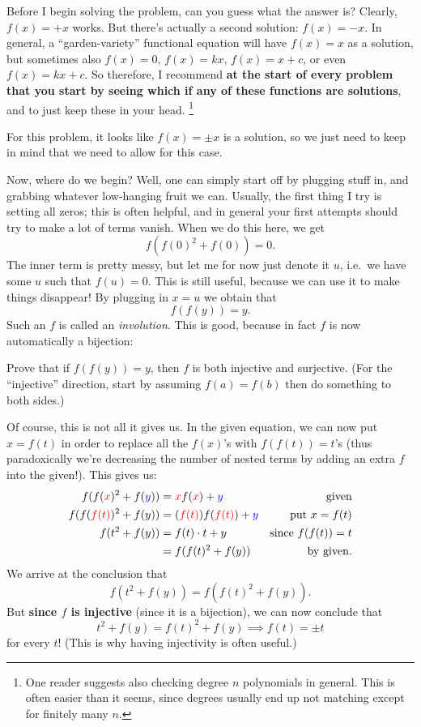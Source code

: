 \documentclass[11pt]{scrartcl}
\begin{document}
\begin{soln}
  Before I begin solving the problem, can you guess what the answer is?
  Clearly, $f(x) = +x$ works.
  But there's actually a second solution: $f(x) = -x$.
  In general, a ``garden-variety'' functional equation will have $f(x) = x$ as a solution,
  but sometimes also $f(x) = 0$, $f(x) = kx$, $f(x) = x+c$, or even $f(x) = kx+c$.
  So therefore, I recommend \textbf{at the start of every problem that you start by seeing
  which if any of these functions are solutions},
  and to just keep these in your head.%
  \footnote{One reader suggests also
    checking degree $n$ polynomials in general.
    This is often easier than it seems,
    since degrees usually end up not
    matching except for finitely many $n$.}

  For this problem,
  it looks like $f(x) = \pm x$ is a solution, so we just need
  to keep in mind that we need to allow for this case.

  Now, where do we begin?
  Well, one can simply start off by plugging stuff in,
  and grabbing whatever low-hanging fruit we can.
  Usually, the first thing I try is setting all zeros; this is often helpful,
  and in general your first attempts should try to make a lot of terms vanish.
  When we do this here, we get
  \[ f(f(0)^2 + f(0)) = 0. \]
  The inner term is pretty messy, but let me for now just denote it $u$,
  i.e.\ we have some $u$ such that $f(u) = 0$.
  This is still useful, because we can use it to make things disappear!
  By plugging in $x=u$ we obtain that
  \[ f(f(y)) = y. \]
  Such an $f$ is called an \emph{involution}.
  This is good, because in fact $f$ is now automatically a bijection:
  \begin{exercise}
    Prove that if $f(f(y)) = y$, then $f$ is both injective and surjective.
    (For the ``injective'' direction, start by assuming $f(a) = f(b)$
    then do something to both sides.)
  \end{exercise}

  Of course, this is not all it gives us.
  In the given equation, we can now put $x=f(t)$
  in order to replace all the $f(x)$'s with $f(f(t))=t$'s
  (thus paradoxically we're decreasing the number of nested terms
  by adding an extra $f$ into the given!).
  This gives us:
  \begin{align*}
    f(f({\color{red} x})^2+f({\color{blue} y}))
    &= {\color{red} x}f({\color{red} x}) + {\color{blue} y} & \text{given} \\
    f(f({\color{red} f(t)})^2+f(y))
    &= ({\color{red} f(t)})f({\color{red} f(t)}) + {\color{blue} y} & \text{put $x=f(t)$} \\
    f(t^2 + f(y)) &= f(t) \cdot t + y & \text{since } f(f(t)) = t \\
    &= f(f(t)^2+f(y)) & \text{by given}.
  \end{align*}
  We arrive at the conclusion that
  \[ f(t^2+f(y)) = f(f(t)^2+f(y)). \]
  But \textbf{since $f$ is injective}
  (since it is a bijection),
  we can now conclude that
  \[ t^2 + f(y) = f(t)^2 + f(y) \implies f(t) = \pm t \]
  for every $t$!
  (This is why having injectivity is often useful.)


\end{soln}
\end{document}
